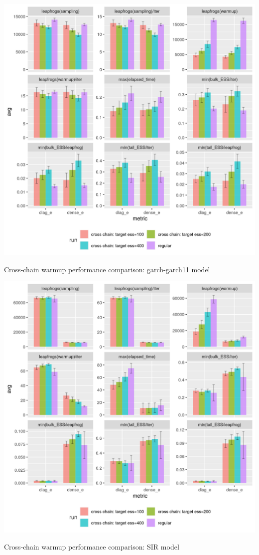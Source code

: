 \documentclass[landscape,a0paper,fontscale=0.5]{baposter} %
\newenvironment{ColFigure}
  {\par\medskip\noindent\minipage{\linewidth}}
  {\endminipage\par\medskip}
\begin{document}
\begin{poster}
{\begin{multicols}{2}
\begin{ColFigure}
\centering
\includegraphics[width=0.8\linewidth]{./figure/cross_chain_ess_effect_sblrc-blr.png}
\caption{Cross-chain warmup performance comparison: garch-garch11 model}
\end{ColFigure}

\begin{ColFigure}
\centering
\includegraphics[width=0.8\linewidth]{./figure/cross_chain_ess_effect_sir.png}
\caption{Cross-chain warmup performance comparison: SIR model}
\end{ColFigure}


\end{multicols}}
\end{poster}
\end{document}
